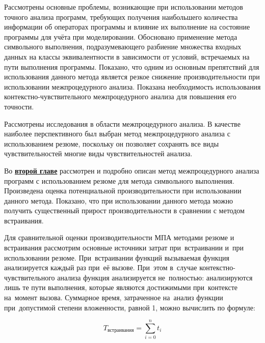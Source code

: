 Рассмотрены основные проблемы, возникающие при использовании методов точного анализа программ, требующих получения наибольшего количества информации об операторах программы и влияние их выполнение на состояние программы для учёта при моделировании. Обосновано применение метода символьного выполнения, подразумевающего разбиение множества входных данных на классы эквивалентности в зависимости от условий, встречаемых на пути выполнения программы. Показано, что одним из основным препятствий для использования данного метода является резкое снижение производительности при использовании межпроцедурного анализа. Показана необходимость использования контекстно-чувствительного межпроцедурного анализа для повышения его точности.

Рассмотрены исследования в области межпроцедурного анализа. В качестве наиболее перспективного был выбран метод межпроцедурного анализа с использованием резюме, поскольку он позволяет сохранять все виды чувствительностей многие виды чувствительностей анализа.


Во \underline{\textbf{второй главе}} рассмотрен и подробно описан метод межпроцедурного анализа программ с использованием резюме для метода символьного выполнения. Произведена оценка потенциальной производительности при использовании данного метода. Показано, что при использовании данного метода можно получить существенный прирост производительности в сравнении с методом встраивания.

Для сравнительной оценки производительности МПА методами резюме и встраивания рассмотрим основные источники затрат при~встраивании и~при использовании резюме. При~встраивании функций вызываемая функция анализируется каждый раз при~её вызове. При~этом в~случае контекстно-чувствительного анализа функция анализируется не~полностью: анализируются лишь те пути выполнения, которые являются достижимыми при~контексте на~момент вызова. Суммарное время, затраченное на~анализ функции при~допустимой степени вложенности, равной 1, можно вычислить по формуле:

\begin{equation}
 T_{\text{встраивания}} = \sum_{i = 0}^{n} t_i 
\end{equation}

